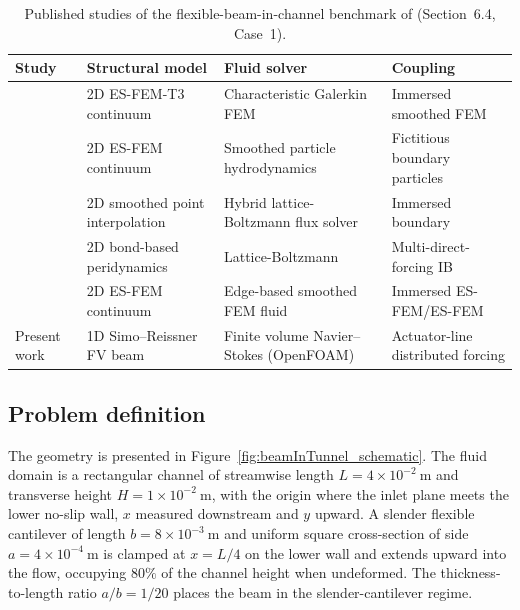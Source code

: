 \begin{table}[!ht]
\centering
\small
\caption{Published studies of the flexible-beam-in-channel benchmark of \citet{zhang_immersed_2012} (Section~6.4, Case~1).}
\label{tab:beamtunnel_refstudies}
\setlength{\tabcolsep}{5pt}
\renewcommand{\arraystretch}{1.30}
\begin{tabularx}{\linewidth}{l X X X}
\toprule
Study & Structural model & Fluid solver & Coupling \\
\midrule
\citet{zhang_immersed_2012}          & 2D ES-FEM-T3 continuum          & Characteristic Galerkin FEM            & Immersed smoothed FEM \\
\citet{long_coupling_esfem_sph_2021} & 2D ES-FEM continuum             & Smoothed particle hydrodynamics        & Fictitious boundary particles \\
\citet{yan_explicit_velocity_iblbm_2023} & 2D smoothed point interpolation & Hybrid lattice-Boltzmann flux solver & Immersed boundary \\
\citet{yang_peridynamics_iblbm_2022} & 2D bond-based peridynamics      & Lattice-Boltzmann                      & Multi-direct-forcing IB \\
\citet{wang_immersed_esfem_2022}     & 2D ES-FEM continuum             & Edge-based smoothed FEM fluid          & Immersed ES-FEM/ES-FEM \\
\midrule
Present work                          & 1D Simo--Reissner FV beam       & Finite volume Navier--Stokes (OpenFOAM) & Actuator-line distributed forcing \\
\bottomrule
\end{tabularx}
\end{table}

\subsection{Problem definition}
\label{sec:beamtunnel_geometry}
The geometry is presented in Figure~\ref{fig:beamInTunnel_schematic}. The fluid domain is a rectangular channel of streamwise length $L = 4\times10^{-2}~\mathrm{m}$ and transverse height $H = 1\times10^{-2}~\mathrm{m}$, with the origin where the inlet plane meets the lower no-slip wall, $x$ measured downstream and $y$ upward. A slender flexible cantilever of length $b = 8\times10^{-3}~\mathrm{m}$ and uniform square cross-section of side $a = 4\times10^{-4}~\mathrm{m}$ is clamped at $x = L/4$ on the lower wall and extends upward into the flow, occupying $80\%$ of the channel height when undeformed. The thickness-to-length ratio $a/b = 1/20$ places the beam in the slender-cantilever regime.

